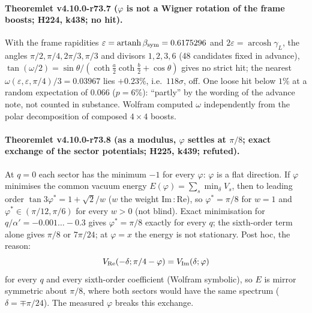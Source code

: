 \paragraph{Theoremlet v4.10.0-r73.7 (\(\varphi\) is not a Wigner rotation of the frame boosts; H224, k438; no hit).}
With the frame rapidities \(\varepsilon=\operatorname{artanh}\beta_{\rm sym}=0.6175296\) and \(2\varepsilon=\operatorname{arcosh}\gamma_L\), the angles
\(\pi/2,\pi/4,2\pi/3,\pi/3\) and divisors \(1,2,3,6\) (48 candidates fixed in advance), \(\tan(\omega/2)=\sin\theta/(\coth\frac a2\coth\frac b2+\cos\theta)\)
gives no strict hit; the nearest \(\omega(\varepsilon,\varepsilon,\pi/4)/3=0.03967\) lies \(+0.23\%\), i.e.\ \(118\sigma\), off.  One loose hit below
\(1\%\) at a random expectation of \(0.066\) (\(p=6\%\)): ``partly'' by the wording of the advance note, not counted in substance.  Wolfram
computed \(\omega\) independently from the polar decomposition of composed \(4\times4\) boosts.

\paragraph{Theoremlet v4.10.0-r73.8 (as a modulus, \(\varphi\) settles at \(\pi/8\); exact exchange of the sector potentials; H225, k439; refuted).}
At \(q=0\) each sector has the minimum \(-1\) for every \(\varphi\): \(\varphi\) is a flat direction.  If \(\varphi\) minimises the common vacuum
energy \(E(\varphi)=\sum_s\min_\delta V_s\), then to leading order \(\tan3\varphi^*=1+\sqrt2/w\) (\(w\) the weight Im\,:\,Re), so \(\varphi^*=\pi/8\) for
\(w=1\) and \(\varphi^*\in(\pi/12,\pi/6)\) for every \(w>0\) (not blind).  Exact minimisation for \(q/\alpha'=-0.001\ldots-0.3\) gives \(\varphi^*=\pi/8\)
exactly for every \(q\); the sixth-order term alone gives \(\pi/8\) or \(7\pi/24\); at \(\varphi=x\) the energy is not stationary.  Post hoc, the
reason:
\[
V_{\rm Re}(-\delta;\pi/4-\varphi)=V_{\rm Im}(\delta;\varphi)
\]
for every \(q\) and every sixth-order coefficient (Wolfram symbolic), so \(E\) is mirror symmetric about \(\pi/8\), where both sectors would have the
same spectrum (\(\delta=\mp\pi/24\)).  The measured \(\varphi\) breaks this exchange.

